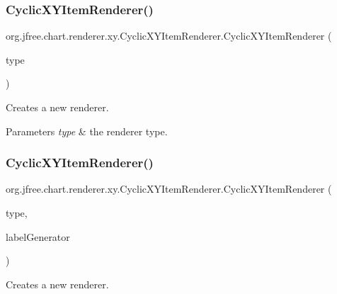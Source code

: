 \subsubsection{\texorpdfstring{Cyclic\+X\+Y\+Item\+Renderer()}{CyclicXYItemRenderer()}\hspace{0.1cm}{\footnotesize\ttfamily [2/4]}}
{\footnotesize\ttfamily org.\+jfree.\+chart.\+renderer.\+xy.\+Cyclic\+X\+Y\+Item\+Renderer.\+Cyclic\+X\+Y\+Item\+Renderer (\begin{DoxyParamCaption}\item[{int}]{type }\end{DoxyParamCaption})}

Creates a new renderer.


\begin{DoxyParams}{Parameters}
{\em type} & the renderer type. \\
\hline
\end{DoxyParams}
\mbox{\label{classorg_1_1jfree_1_1chart_1_1renderer_1_1xy_1_1_cyclic_x_y_item_renderer_a118969b7a23bf99acedb4168b2531a68}} 
\subsubsection{\texorpdfstring{Cyclic\+X\+Y\+Item\+Renderer()}{CyclicXYItemRenderer()}\hspace{0.1cm}{\footnotesize\ttfamily [3/4]}}
{\footnotesize\ttfamily org.\+jfree.\+chart.\+renderer.\+xy.\+Cyclic\+X\+Y\+Item\+Renderer.\+Cyclic\+X\+Y\+Item\+Renderer (\begin{DoxyParamCaption}\item[{int}]{type,  }\item[{\mbox{\hyperlink{interfaceorg_1_1jfree_1_1chart_1_1labels_1_1_x_y_tool_tip_generator}{X\+Y\+Tool\+Tip\+Generator}}}]{label\+Generator }\end{DoxyParamCaption})}

Creates a new renderer.


